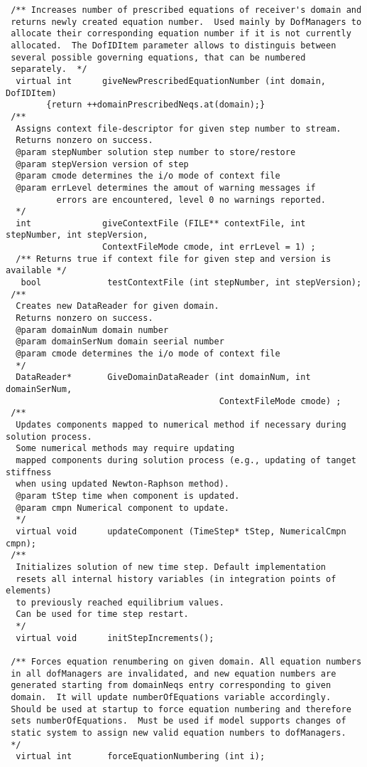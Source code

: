\documentclass[12pt,draft]{article}
\begin{document}
{\begin{verbatim}
 /** Increases number of prescribed equations of receiver's domain and
 returns newly created equation number.  Used mainly by DofManagers to
 allocate their corresponding equation number if it is not currently
 allocated.  The DofIDItem parameter allows to distinguis between
 several possible governing equations, that can be numbered
 separately.  */
  virtual int      giveNewPrescribedEquationNumber (int domain, DofIDItem) 
        {return ++domainPrescribedNeqs.at(domain);}
 /** 
  Assigns context file-descriptor for given step number to stream.
  Returns nonzero on success.
  @param stepNumber solution step number to store/restore
  @param stepVersion version of step
  @param cmode determines the i/o mode of context file
  @param errLevel determines the amout of warning messages if
          errors are encountered, level 0 no warnings reported.
  */
  int              giveContextFile (FILE** contextFile, int stepNumber, int stepVersion, 
                   ContextFileMode cmode, int errLevel = 1) ;
  /** Returns true if context file for given step and version is available */
   bool             testContextFile (int stepNumber, int stepVersion);
 /** 
  Creates new DataReader for given domain.
  Returns nonzero on success.
  @param domainNum domain number
  @param domainSerNum domain seerial number
  @param cmode determines the i/o mode of context file
  */
  DataReader*       GiveDomainDataReader (int domainNum, int domainSerNum, 
                                          ContextFileMode cmode) ;
 /**
  Updates components mapped to numerical method if necessary during solution process.
  Some numerical methods may require updating
  mapped components during solution process (e.g., updating of tanget stiffness
  when using updated Newton-Raphson method). 
  @param tStep time when component is updated.
  @param cmpn Numerical component to update.
  */
  virtual void      updateComponent (TimeStep* tStep, NumericalCmpn cmpn);
 /**
  Initializes solution of new time step. Default implementation
  resets all internal history variables (in integration points of elements)
  to previously reached equilibrium values.
  Can be used for time step restart.
  */
  virtual void      initStepIncrements();

 /** Forces equation renumbering on given domain. All equation numbers
 in all dofManagers are invalidated, and new equation numbers are
 generated starting from domainNeqs entry corresponding to given
 domain.  It will update numberOfEquations variable accordingly.
 Should be used at startup to force equation numbering and therefore
 sets numberOfEquations.  Must be used if model supports changes of
 static system to assign new valid equation numbers to dofManagers.
 */
  virtual int       forceEquationNumbering (int i);


\end{verbatim}}
\end{document}
